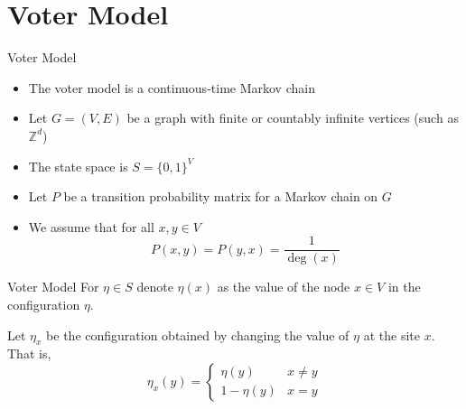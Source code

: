 \documentclass{beamer}
\theoremstyle{definition}
\newcommand{\Z}{\mathbb{Z}}
\begin{document}


\section{Voter Model}

\begin{frame}{Voter Model}
\begin{itemize}
    \item The voter model is a continuous-time Markov chain
    \item Let $G = (V,E)$ be a graph with finite or countably infinite vertices (such as $\Z^d$)
    \item The state space is $S = \{0,1\}^{V}$
    \item Let $P$ be a transition probability matrix for a Markov chain on $G$
    \item We assume that for all $x,y \in V$
    $$
    P(x,y) = P(y,x) = \frac{1}{\deg(x)}
    $$
\end{itemize}
\end{frame}

\begin{frame}{Voter Model}
For $\eta \in S$ denote $\eta(x)$ as the value of the node $x \in V$ in the configuration $\eta$.

Let $\eta_x$ be the configuration obtained by changing the value of $\eta$ at the site $x$. That is,
$$
\eta_x(y) = \begin{cases}
    \eta(y) & x \not = y\\
    1 - \eta(y) & x = y
\end{cases}
$$
\end{frame}
\end{document}
